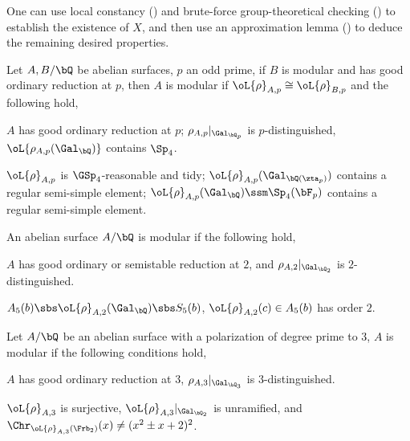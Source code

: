 \documentclass[article, a4paper, twoside]{universal}
\begin{document}
\begin{prf}
    One can use local constancy (\cite[Theorem~5.1]{Kisin1999}) and brute-force group-theoretical checking (\cite[9.2.3]{BCGP2025}) to establish the existence of $X$, and then use an approximation lemma (\cite[9.4.1]{BCGP2025}) to deduce the remaining desired properties.
\end{prf}

\begin{thm}\label{thm:modularity-transfer}
    Let $A,B/\bQ$ be abelian surfaces, $p$ an odd prime, if $B$ is modular and has good ordinary reduction at $p$, then $A$ is modular if $\oL{\rho}_{A,p}\cong\oL{\rho}_{B,p}$ and the following hold,
    \begin{itm}
        \item $A$ has good ordinary reduction at $p$; $\rho_{A,p}|_{\Gal_{\bQ_{p}}}$ is $p$-distinguished, $\oL{\rho_{A,p}(\Gal_{\bQ})}$ contains $\Sp_{4}$.
        \item $\oL{\rho}_{A,p}$ is $\GSp_{4}$-reasonable and tidy; $\oL{\rho}_{A,p}(\Gal_{\bQ(\zta_{p})})$ contains a regular semi-simple element; $\oL{\rho}_{A,p}(\Gal_{\bQ})\ssm\Sp_{4}(\bF_{p})$ contains a regular semi-simple element.
    \end{itm}
\end{thm}

\begin{thm}\label{thm:2-adic-modularity}
    An abelian surface $A/\bQ$ is modular if the following hold,
    \begin{itm}
        \item $A$ has good ordinary or semistable reduction at $2$, and $\rho_{A,2}|_{\Gal_{\bQ_{2}}}$ is $2$-distinguished.
        \item $A_{5}(b)\sbs\oL{\rho}_{A,2}(\Gal_{\bQ})\sbs S_{5}(b)$, $\oL{\rho}_{A,2}(c)\in A_{5}(b)$ has order $2$.
    \end{itm}
\end{thm}

\begin{thm}
    Let $A/\bQ$ be an abelian surface with a polarization of degree prime to $3$, $A$ is modular if the following conditions hold,
    \begin{itm}
        \item $A$ has good ordinary reduction at $3$, $\rho_{A,3}|_{\Gal_{\bQ_{3}}}$ is $3$-distinguished.
        \item $\oL{\rho}_{A,3}$ is surjective, $\oL{\rho}_{A,3}|_{\Gal_{\bQ_{2}}}$ is unramified, and $\Chr_{\oL{\rho}_{A,3}(\Frb_{2})}(x)\neq(x^{2}\pm x+2)^{2}$.
    \end{itm}
\end{thm}
\end{document}
